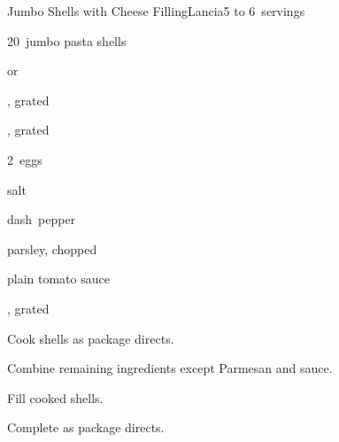 \begin{recipe}{Jumbo Shells with Cheese Filling\FIXME}{Lancia}{5 to 6~servings}

\begin{ingredients}
\item 20~jumbo pasta shells
\item {}  or 
\item \C{1\half} , grated
\item \C{1\half} , grated
\item 2~eggs
\item \tp{\half} salt
\item dash~pepper
\item {} parsley, chopped
\item \C{3\half} plain tomato sauce
\item \C{\quarter} , grated
\end{ingredients}

\begin{directions}
\item Cook shells as package directs.
\item Combine remaining ingredients except Parmesan and sauce.
\item Fill cooked shells.
\item Complete as package directs.
\end{directions}

\end{recipe}
